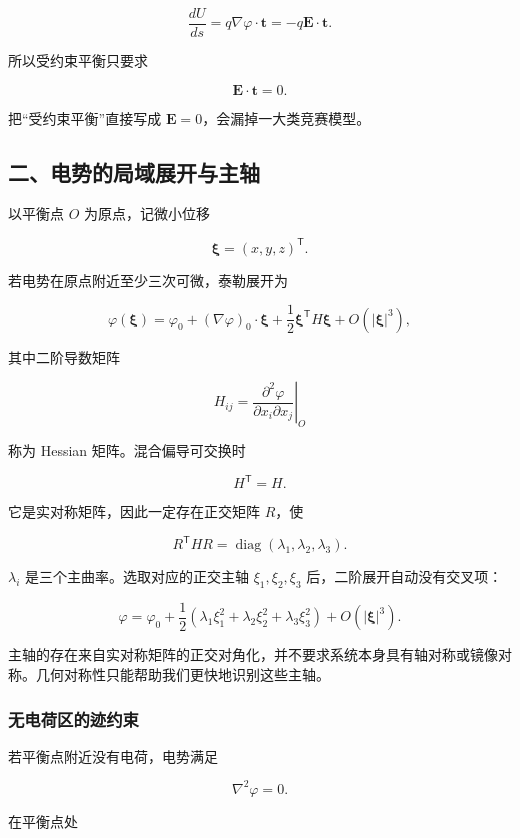 \[
\frac{dU}{ds}
=q\nabla\varphi\cdot\mathbf t
=-q\mathbf E\cdot\mathbf t.
\]

所以受约束平衡只要求

\[
\boxed{\mathbf E\cdot\mathbf t=0.}
\]

把``受约束平衡''直接写成 \(\mathbf E=0\)，会漏掉一大类竞赛模型。

\subsection{二、电势的局域展开与主轴}\label{m2:ux4e8cux7535ux52bfux7684ux5c40ux57dfux5c55ux5f00ux4e0eux4e3bux8f74}

以平衡点 \(O\) 为原点，记微小位移

\[
\boldsymbol{\xi}=(x,y,z)^{\mathsf T}.
\]

若电势在原点附近至少三次可微，泰勒展开为

\[
\varphi(\boldsymbol{\xi})
=\varphi_0
+(\nabla\varphi)_0\cdot\boldsymbol{\xi}
+\frac12\boldsymbol{\xi}^{\mathsf T}H\boldsymbol{\xi}
+O(|\boldsymbol{\xi}|^3),
\]

其中二阶导数矩阵

\[
H_{ij}
=\left.\frac{\partial^2\varphi}
{\partial x_i\partial x_j}\right|_O
\]

称为 Hessian 矩阵。混合偏导可交换时

\[
H^{\mathsf T}=H.
\]

它是实对称矩阵，因此一定存在正交矩阵 \(R\)，使

\[
R^{\mathsf T}HR
=\operatorname{diag}(\lambda_1,\lambda_2,\lambda_3).
\]

\(\lambda_i\) 是三个主曲率。选取对应的正交主轴 \(\xi_1,\xi_2,\xi_3\)
后，二阶展开自动没有交叉项：

\[
\varphi
=\varphi_0
+\frac12
\left(\lambda_1\xi_1^2
+\lambda_2\xi_2^2
+\lambda_3\xi_3^2\right)
+O(|\boldsymbol{\xi}|^3).
\]

主轴的存在来自实对称矩阵的正交对角化，并不要求系统本身具有轴对称或镜像对称。几何对称性只能帮助我们更快地识别这些主轴。

\subsubsection{无电荷区的迹约束}\label{m2:ux65e0ux7535ux8377ux533aux7684ux8ff9ux7ea6ux675f}

若平衡点附近没有电荷，电势满足

\[
\nabla^2\varphi=0.
\]

在平衡点处

